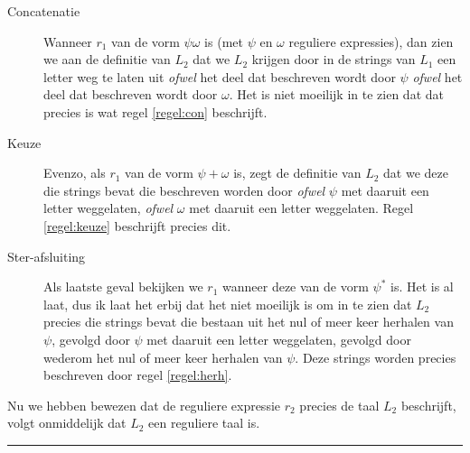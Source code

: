 \documentclass[a4paper,11pt]{article}
\begin{document}
\begin{description}

\item[Concatenatie]

Wanneer $r_{1}$ van de vorm $\psi \omega$ is (met $\psi$ en $\omega$ reguliere
expressies), dan zien we aan de definitie van $L_{2}$ dat we $L_{2}$ krijgen
door in de strings van $L_{1}$ een letter weg te laten uit \emph{ofwel} het
deel dat beschreven wordt door $\psi$ \emph{ofwel} het deel dat beschreven
wordt door $\omega$. Het is niet moeilijk in te zien dat dat precies is wat
regel \ref{regel:con} beschrijft.

\item[Keuze]

Evenzo, als $r_{1}$ van de vorm $\psi + \omega$ is, zegt de definitie van
$L_{2}$ dat we deze die strings bevat die beschreven worden door \emph{ofwel}
$\psi$ met daaruit een letter weggelaten, \emph{ofwel} $\omega$ met daaruit
een letter weggelaten. Regel \ref{regel:keuze} beschrijft precies dit.

\item[Ster-afsluiting]

Als laatste geval bekijken we $r_{1}$ wanneer deze van de vorm $\psi^{*}$
is. Het is al laat, dus ik laat het erbij dat het niet moeilijk is om in
te zien dat $L_{2}$ precies die strings bevat die bestaan uit het nul of
meer keer herhalen van $\psi$, gevolgd door $\psi$ met daaruit een letter
weggelaten, gevolgd door wederom het nul of meer keer herhalen van $\psi$.
Deze strings worden precies beschreven door regel \ref{regel:herh}.

\end{description}

Nu we hebben bewezen dat de reguliere expressie $r_{2}$ precies de taal
$L_{2}$ beschrijft, volgt onmiddelijk dat $L_{2}$ een reguliere taal is.

\hfill\rule{2.1mm}{2.mm}
\end{document}
